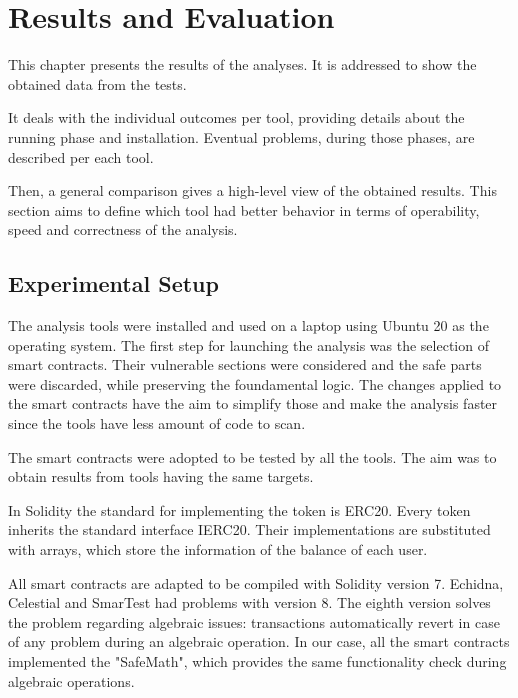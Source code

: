 
\chapter{Results and Evaluation}
\label{ch:Evaluation}
This chapter presents the results of the analyses. It is addressed to show the obtained data from the tests.

It deals with the individual outcomes per tool, providing details about the running phase and installation.
Eventual problems, during those phases, are described per each tool.

Then, a general comparison gives a high-level view of the obtained results.
This section aims to define which tool had better behavior in terms of operability, speed and correctness of the analysis. 

\section {Experimental Setup}
The analysis tools were installed and used on a laptop using Ubuntu 20 as the operating system.
The first step for launching the analysis was the selection of smart contracts.
Their vulnerable sections were considered and the safe parts were discarded, while preserving the foundamental logic.
The changes applied to the smart contracts have the aim to simplify those and make the analysis faster since the tools have less amount of code to scan.

The smart contracts were adopted to be tested by all the tools.
The aim was to obtain results from tools having the same targets.

In Solidity the standard for implementing the token is ERC20.
Every token inherits the standard interface IERC20.
Their implementations are substituted with arrays, which store the information of the balance of each user.

All smart contracts are adapted to be compiled with Solidity version 7.
Echidna, Celestial and SmarTest had problems with version 8.
The eighth version solves the problem regarding algebraic issues:
transactions automatically revert in case of any problem during an algebraic operation.
In our case, all the smart contracts implemented the "SafeMath", which provides the same functionality check during algebraic operations.


